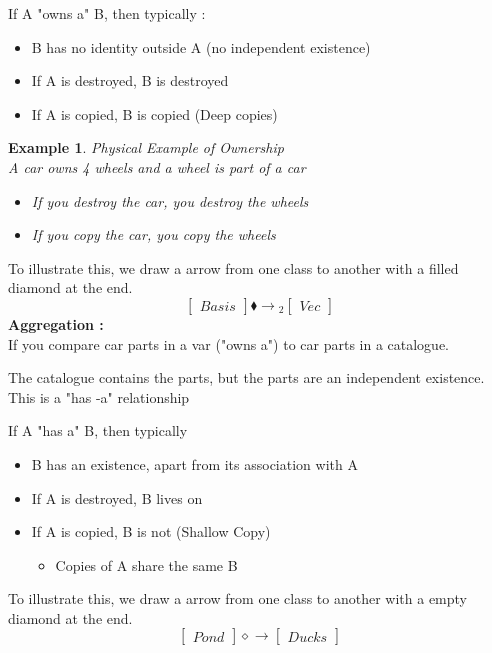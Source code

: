 \documentclass{article}
\newtheorem{ex}[theorem]{Example}
\begin{document}
If A "owns a" B, then typically :
\begin{itemize}
\item B has no identity outside A (no independent existence) 
\item If A is destroyed, B is destroyed 
\item If A is copied, B is copied (Deep copies)
\end{itemize}

\begin{ex} Physical Example of Ownership \\
A car owns 4 wheels and a wheel is part of a car 
\begin{itemize}
\item If you destroy the car, you destroy the wheels
\item If you copy the car, you copy the wheels 
\end{itemize}
\end{ex}

To illustrate this, we draw a arrow from one class to another with a filled diamond at the end.
$$ \begin{bmatrix}
Basis 
\end{bmatrix} \blacklozenge \longrightarrow {}_2\begin{bmatrix}
Vec
\end{bmatrix}$$
\newpage
\textbf{Aggregation : } \\

If you compare car parts in a var ("owns a") to car parts in a catalogue.

The catalogue contains the parts, but the parts are an independent existence. 
This is a "has -a" relationship

If  A "has a" B, then typically 
\begin{itemize}
\item B has an existence, apart from its association with A
\item If A is destroyed, B lives on
\item If A is copied, B is not (Shallow Copy) 
\begin{itemize}
\item Copies of A share the same B 
\end{itemize}
\end{itemize}

To illustrate this, we draw a arrow from one class to another with a empty diamond at the end.
$$ \begin{bmatrix}
Pond
\end{bmatrix} \diamond \longrightarrow \begin{bmatrix}
Ducks
\end{bmatrix}$$
\end{document}
